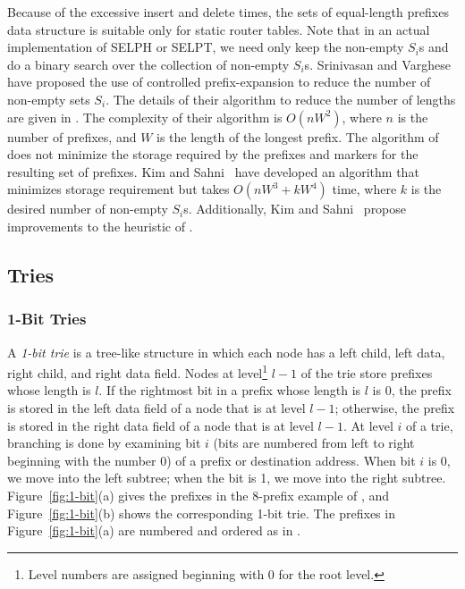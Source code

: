 Because of the excessive insert and delete times,
the sets of equal-length prefixes data structure
is suitable only for static router tables.
Note that in an actual implementation of SELPH or SELPT, we need only keep the
non-empty $S_i$s and do a binary search over the collection
of non-empty $S_i$s. 
Srinivasan and Varghese~\cite{sri:expansion} have proposed the use of
controlled prefix-expansion to reduce the number of non-empty sets $S_i$.
The details of their algorithm to reduce the number of lengths
are given in \cite{sri}. The complexity of their algorithm is
$O(nW^2)$, where $n$ is the number of prefixes,
and $W$ is the
length of the longest prefix. The algorithm of \cite{sri} does not minimize
the storage required by the prefixes and markers for the resulting set of
prefixes.
Kim and Sahni~\cite{kim}
have developed an algorithm that minimizes storage requirement but takes 
$O(nW^3+kW^4)$ time,
where $k$ is the desired
number of non-empty $S_i$s. Additionally, Kim and Sahni~\cite{kim}
propose improvements to the heuristic of \cite{sri}.

\subsection{Tries}
\subsubsection{1-Bit Tries}
A {\em 1-bit trie} is a tree-like structure in which each node has a left
child, left data, right child,
and right data field. Nodes at level\footnote{Level numbers are assigned beginning with 0 for the root level.} $l - 1$
of the trie store prefixes whose length is $l$.
If the rightmost bit in a prefix
whose length is $l$ is $0$,
the prefix is stored in the left data field of a node that is at level $l - 1$;
otherwise, the
prefix is stored in the right data field of a node that is at level $l - 1$.
At level $i$ of a trie,
branching is done by examining bit $i$ (bits are numbered from left to right
beginning with the number 0)
of a prefix or destination address. When bit $i$ is 0, we move
into the left subtree; when the bit is 1, we move into the right subtree.
Figure~\ref{fig:1-bit}(a) gives the prefixes in the
8-prefix example
of \cite{sri:expansion}, and
Figure~\ref{fig:1-bit}(b) shows the corresponding 1-bit trie.
The prefixes in Figure~\ref{fig:1-bit}(a) are numbered and ordered
as in \cite{sri:expansion}.


